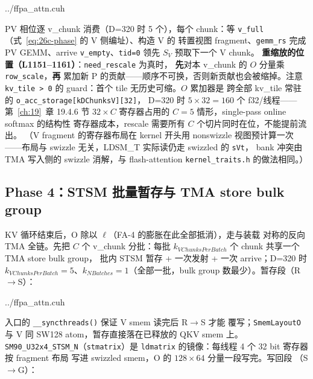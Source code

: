 \begin{lstinputlisting}[linerange={1133-1165},firstnumber=auto,
  title={ffpa\_attn.cuh L1133-1165（Phase 3：$O_v \mathrel{+}= P V_v$ 与 lazy rescale）}]{../ffpa_attn.cuh}
\end{lstinputlisting}

PV 相位逐 v\_chunk 消费（D=320 时 5 个），每个 chunk：等
\texttt{v\_full}（式~\eqref{eq:26c-phase} 的 V 侧编址）、构造 V 的
转置视图 fragment、\texttt{gemm\_rs} 完成 PV GEMM、arrive
\texttt{v\_empty}、\texttt{tid=0} 领先 $S_V$ 预取下一个 V chunk。
\textbf{重缩放的位置（L1151--1161）}：\texttt{need\_rescale} 为真时，
\textbf{先}对本 v\_chunk 的 $O$ 分量乘 \texttt{row\_scale}，\textbf{再}
累加新 P 的贡献——顺序不可换，否则新贡献也会被缩掉。注意
\texttt{kv\_tile > 0} 的 guard：首个 tile 无历史可缩。$O$ 累加器是
跨全部 kv\_tile 常驻的 \texttt{o\_acc\_storage[kDChunksV][32]}，
D=320 时 $5\times32=160$ 个 f32/线程——第~\ref{ch:19}~章 19.4.6 节
$32 \times C$ 寄存器占用的 $C{=}5$ 情形，single-pass online softmax 的结构性
寄存器成本，rescale 需要所有 $C$ 个切片同时在位，不能提前流出。
（V fragment 的寄存器布局在 kernel 开头用 nonswizzle 视图预计算一次
——布局与 swizzle 无关，LDSM\_T 实际读仍走 swizzled 的 \texttt{sVt}，
bank 冲突由 TMA 写入侧的 swizzle 消解，与 flash-attention
\texttt{kernel\_traits.h} 的做法相同。）

\subsection{Phase 4：STSM 批量暂存与 TMA store bulk group}\label{sec:26c-epilogue}

KV 循环结束后，O 除以 $\ell$（FA-4 的膨胀在此全部抵消），走与装载
对称的反向 TMA 全链。先把 $C$ 个 v\_chunk 分批：每批
$k_{VChunksPerBatch}$ 个 chunk 共享一个 TMA store bulk group，
批内 STSM 暂存 + 一次发射 + 一次 arrive；D=320 时
$k_{VChunksPerBatch}{=}5$、$k_{NBatches}{=}1$（全部一批，bulk
group 数最少）。暂存段（R$\to$S）：

\begin{lstinputlisting}[linerange={1204-1226},firstnumber=auto,
  title={ffpa\_attn.cuh L1204-1226（epilogue 批 I：$\div\ell$、f16、STSM 暂存复用 QKV smem）}]{../ffpa_attn.cuh}
\end{lstinputlisting}

入口的 \texttt{\_\_syncthreads()} 保证 V smem 读完后 R$\to$S 才能
覆写；\texttt{SmemLayoutO} 与 V 同 SW128 atom，暂存直接落在已释放的
QKV smem 上。\texttt{SM90\_U32x4\_STSM\_N}（\texttt{stmatrix}）是
\texttt{ldmatrix} 的镜像：每线程 4 个 32 bit 寄存器按 fragment 布局
写进 swizzled smem，O 的 $128\times64$ 分量一段写完。写回段
（S$\to$G）：


